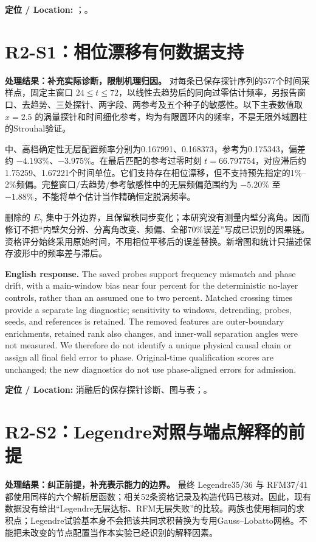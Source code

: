 \noindent\textbf{定位 / Location:} ；。

\section{R2-S1：相位漂移有何数据支持}
\textbf{处理结果：补充实际诊断，限制机理归因。}
对每条已保存探针序列的577个时间采样点，固定主窗口 $24\leq t\leq72$，以线性去趋势后的同向过零估计频率，另报告窗口、去趋势、三处探针、两字段、两参考及五个种子的敏感性。以下主表数值取 $x=2.5$ 的涡量探针和时间细化参考，均为有限圆环内的频率，不是无限外域圆柱的Strouhal验证。

中、高档确定性无层配置频率分别为0.167991、0.168373，参考为0.175343，偏差约 $-4.193\%$、$-3.975\%$。在最后匹配的参考过零时刻 $t=66.797754$，对应滞后约1.75259、1.67221个时间单位。它们支持存在相位漂移，但不支持预先指定的1\%--2\%频偏。完整窗口/去趋势/参考敏感性中的无层频偏范围约为 $-5.20\%$ 至 $-1.88\%$，不能将单个估计当作精确恒定脱涡频率。

删除的 $E_\gamma$ 集中于外边界，且保留秩同步变化；本研究没有测量内壁分离角。因而修订不把“内壁欠分辨、分离角改变、频偏、全部70\%误差”写成已识别的因果链。资格评分始终采用原始时间，不用相位平移后的误差替换。新增图和统计只描述保存波形中的频率差与滞后。

\noindent\textbf{English response.}
The saved probes support frequency mismatch and phase drift, with a main-window bias near four percent for the deterministic no-layer controls, rather than an assumed one to two percent. Matched crossing times provide a separate lag diagnostic; sensitivity to windows, detrending, probes, seeds, and references is retained. The removed features are outer-boundary enrichments, retained rank also changes, and inner-wall separation angles were not measured. We therefore do not identify a unique physical causal chain or assign all final field error to phase. Original-time qualification scores are unchanged; the new diagnostics do not use phase-aligned errors for admission.

\noindent\textbf{定位 / Location:} 消融后的保存探针诊断、图与表；。

\section{R2-S2：Legendre对照与端点解释的前提}
\textbf{处理结果：纠正前提，补充表示能力的边界。}
最终 Legendre35/36 与 RFM37/41 都使用同样的六个解析层函数；相关52条资格记录及构造代码已核对。因此，现有数据没有给出“Legendre无层达标、RFM无层失败”的比较。两族也使用相同的求积点；Legendre试验基本身不会把该共同求积替换为专用Gauss--Lobatto网格。不能把未改变的节点配置当作本实验已经识别的解释因素。

